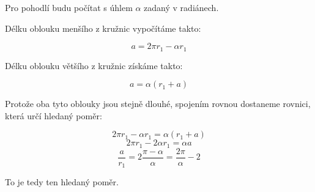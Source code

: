 \documentclass{fkssolpub}
\author{Ondřej Sedláček}
\begin{document}
Pro pohodlí budu počítat s úhlem $\alpha$ zadaný v radiánech.

Délku oblouku menšího z kružnic vypočítáme takto:

\[
  a = 2 \pi r_1 - \alpha r_1
\]

Délku oblouku většího z kružnic získáme takto:

\[
  a = \alpha (r_1 + a)
\]

Protože oba tyto oblouky jsou stejně dlouhé, spojením rovnou dostaneme rovnici, která určí hledaný poměr:

\[
  2 \pi r_1 - \alpha r_1 = \alpha (r_1 + a)
\]
\[
  2 \pi r_1 - 2 \alpha r_1 = \alpha a
\]
\[
  \frac{a}{r_1} = 2 \frac{\pi - \alpha}{\alpha} = \frac{2 \pi}{\alpha} - 2
\]

To je tedy ten hledaný poměr.
\end{document}
